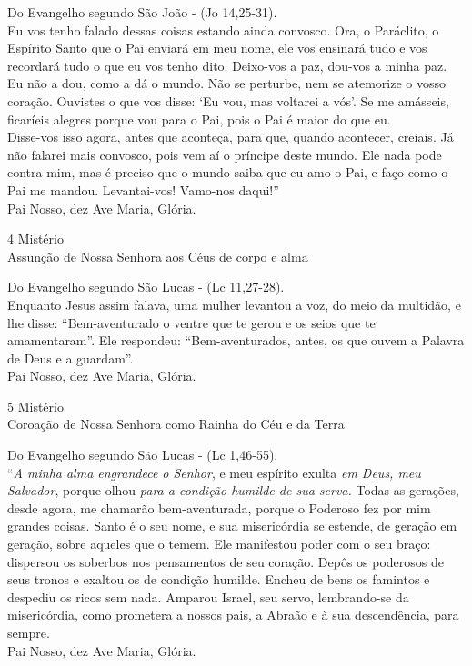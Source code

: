 \begin{flushleft}
    Do Evangelho segundo São João - (\textcolor{VioletRed2}{Jo 14,25-31}). \\
    \hfill{} \break{}
    Eu vos tenho falado dessas coisas estando ainda convosco. Ora, o Paráclito, o Espírito Santo que o Pai enviará em meu nome, ele vos ensinará tudo e vos recordará tudo o que eu vos tenho dito. Deixo-vos a paz, dou-vos a minha paz. Eu não a dou, como a dá o mundo. Não se perturbe, nem se atemorize o vosso coração. Ouvistes o que vos disse: `Eu vou, mas voltarei a vós'. Se me amásseis, ficaríeis alegres porque vou para o Pai, pois o Pai é maior do que eu.
    \vspace{.2cm} \\
    Disse-vos isso agora, antes que aconteça, para que, quando acontecer, creiais. Já não falarei mais convosco, pois vem aí o príncipe deste mundo. Ele nada pode contra mim, mas é preciso que o mundo saiba que eu amo o Pai, e faço como o Pai me mandou. Levantai-vos! Vamo-nos daqui!'' \\
    \hfill{} \break{}
    Pai Nosso, dez Ave Maria, Glória.
\end{flushleft}
\begin{center}
    4\textordmasculine{} Mistério \\ Assunção de Nossa Senhora aos Céus de corpo e alma
\end{center}
\begin{flushleft}
    Do Evangelho segundo São Lucas - (\textcolor{VioletRed2}{Lc 11,27-28}). \\
    \hfill{} \break{}
    Enquanto Jesus assim falava, uma mulher levantou a voz, do meio da multidão, e lhe disse: ``Bem-aventurado o ventre que te gerou e os seios que te amamentaram''. Ele respondeu: ``Bem-aventurados, antes, os que ouvem a Palavra de Deus e a guardam''. \\
    \hfill{} \break{}
    Pai Nosso, dez Ave Maria, Glória.
\end{flushleft}
\newpage
\begin{center}
    5\textordmasculine{} Mistério \\ Coroação de Nossa Senhora como Rainha do Céu e da Terra
\end{center}
\begin{flushleft}
    Do Evangelho segundo São Lucas - (\textcolor{VioletRed2}{Lc 1,46-55}). \\
    \hfill{} \break{}
    ``\textit{A minha alma engrandece o Senhor}, e meu espírito exulta \textit{em Deus, meu Salvador}, porque olhou \textit{para a condição humilde de sua serva.} Todas as gerações, desde agora, me chamarão bem-aventurada, porque o Poderoso fez por mim grandes coisas. Santo é o seu nome, e sua misericórdia se estende, de geração em geração, sobre aqueles que o temem. Ele manifestou poder com o seu braço: dispersou os soberbos nos pensamentos de seu coração. Depôs os poderosos de seus tronos e exaltou os de condição humilde. Encheu de bens os famintos e despediu os ricos sem nada. Amparou Israel, seu servo, lembrando-se da misericórdia, como prometera a nossos pais, a Abraão e à sua descendência, para sempre. \\
    \hfill{} \break{}
    Pai Nosso, dez Ave Maria, Glória.
\end{flushleft}
